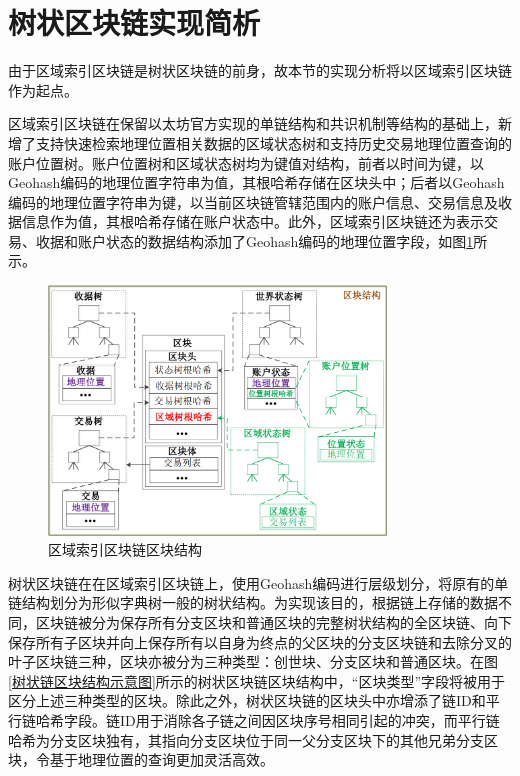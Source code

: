 \section{树状区块链实现简析}

由于区域索引区块链是树状区块链的前身，故本节的实现分析将以区域索引区块链作为起点。

区域索引区块链在保留以太坊官方实现的单链结构和共识机制等结构的基础上，新增了支持快速检索地理位置相关数据的区域状态树和支持历史交易地理位置查询的账户位置树。账户位置树和区域状态树均为键值对结构，前者以时间为键，以Geohash编码的地理位置字符串为值，其根哈希存储在区块头中；后者以Geohash编码的地理位置字符串为键，以当前区块链管辖范围内的账户信息、交易信息及收据信息作为值，其根哈希存储在账户状态中。此外，区域索引区块链还为表示交易、收据和账户状态的数据结构添加了Geohash编码的地理位置字段，如图\ref{区域链区块示意图}所示。

\begin{figure}[htbp]
    \centering
    \includegraphics[width=0.8\textwidth]{images/区域链区块示意图.png}
    \caption{区域索引区块链区块结构}\label{区域链区块示意图} %
\end{figure}

树状区块链在在区域索引区块链上，使用Geohash编码进行层级划分，将原有的单链结构划分为形似字典树一般的树状结构。为实现该目的，根据链上存储的数据不同，区块链被分为保存所有分支区块和普通区块的完整树状结构的全区块链、向下保存所有子区块并向上保存所有以自身为终点的父区块的分支区块链和去除分叉的叶子区块链三种，区块亦被分为三种类型：创世块、分支区块和普通区块。在图\ref{树状链区块结构示意图}所示的树状区块链区块结构中，“区块类型”字段将被用于区分上述三种类型的区块。除此之外，树状区块链的区块头中亦增添了链ID和平行链哈希字段。链ID用于消除各子链之间因区块序号相同引起的冲突，而平行链哈希为分支区块独有，其指向分支区块位于同一父分支区块下的其他兄弟分支区块，令基于地理位置的查询更加灵活高效。


